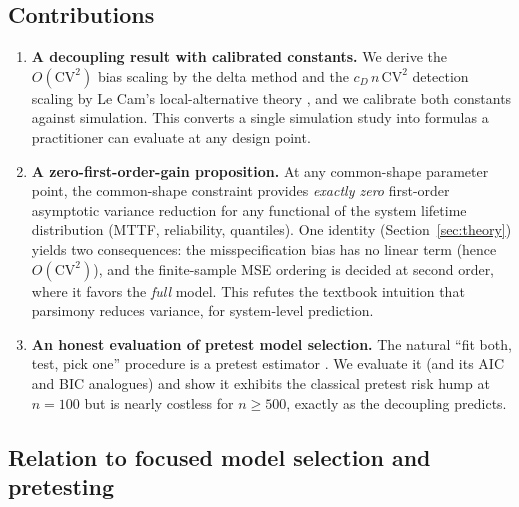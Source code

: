 \documentclass[11pt]{article}
\newcommand{\CV}{\mathrm{CV}}
\begin{document}
\subsection{Contributions}

\begin{enumerate}
\item \textbf{A decoupling result with calibrated constants.} We derive the $O(\CV^2)$ bias scaling by the delta method \citep{casella2002} and the $c_D\,n\,\CV^2$ detection scaling by Le Cam's local-alternative theory \citep{vandervaart1998}, and we calibrate both constants against simulation. This converts a single simulation study into formulas a practitioner can evaluate at any design point.
\item \textbf{A zero-first-order-gain proposition.} At any common-shape parameter point, the common-shape constraint provides \emph{exactly zero} first-order asymptotic variance reduction for any functional of the system lifetime distribution (MTTF, reliability, quantiles). One identity (Section~\ref{sec:theory}) yields two consequences: the misspecification bias has no linear term (hence $O(\CV^2)$), and the finite-sample MSE ordering is decided at second order, where it favors the \emph{full} model. This refutes the textbook intuition that parsimony reduces variance, for system-level prediction.
\item \textbf{An honest evaluation of pretest model selection.} The natural ``fit both, test, pick one'' procedure is a pretest estimator \citep{bancroft1944, judge1978}. We evaluate it (and its AIC and BIC analogues) and show it exhibits the classical pretest risk hump at $n=100$ but is nearly costless for $n \geq 500$, exactly as the decoupling predicts.
\end{enumerate}

\subsection{Relation to focused model selection and pretesting}
\label{sec:fic}
\end{document}
